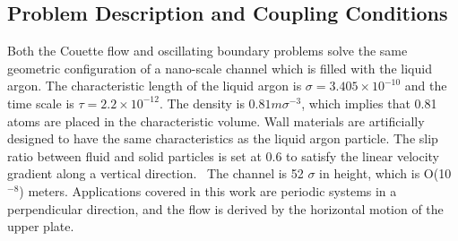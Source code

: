\documentclass[preprint,12pt]{elsarticle}
\begin{document}
\subsection{Problem Description and Coupling Conditions}
\label{sec:accuracy_conditions}

Both the Couette flow and oscillating boundary problems solve the same geometric configuration of a nano-scale channel which is filled with the liquid argon. The characteristic length of the liquid argon is ${\sigma}=3.405{\times}10^{-10}$ and the time scale is $\tau=2.2{\times}10^{-12}$. The density is $0.81m{\sigma}^{-3}$, which implies that 0.81 atoms are placed in the characteristic volume. Wall materials are artificially designed to have the same characteristics as the liquid argon particle. The slip ratio between fluid and solid particles is set at 0.6 to satisfy the linear velocity gradient along a vertical direction.~\cite{Nie}
The channel is 52 $\sigma$ in height, which is O(10$^{-8}$) meters. Applications covered in this work are periodic systems in a perpendicular direction, and the flow is derived by the horizontal motion of the upper plate.


\end{document}
